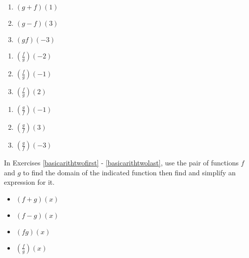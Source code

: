 \begin{multicols}{3}
\begin{enumerate}
\setcounter{enumi}{\value{HW}}

\item $(g + f)(1)$
\item $(g - f)(3)$
\item $(gf)(-3)$

\setcounter{HW}{\value{enumi}}
\end{enumerate}
\end{multicols}

\begin{multicols}{3}
\begin{enumerate}
\setcounter{enumi}{\value{HW}}

\item $\left(\frac{f}{g}\right)(-2)$
\item $\left(\frac{f}{g}\right)(-1)$
\item $\left(\frac{f}{g}\right)(2)$

\setcounter{HW}{\value{enumi}}
\end{enumerate}
\end{multicols}

\begin{multicols}{3}
\begin{enumerate}
\setcounter{enumi}{\value{HW}}

\item $\left(\frac{g}{f}\right)(-1)$
\item $\left(\frac{g}{f}\right)(3)$
\item $\left(\frac{g}{f}\right)(-3)$ \label{reformarithlast}

\setcounter{HW}{\value{enumi}}
\end{enumerate}
\end{multicols}

In Exercises \ref{basicarithtwofirst} - \ref{basicarithtwolast}, use the pair of functions $f$ and $g$ to find the domain of the indicated function then find and simplify an expression for it.

\begin{multicols}{4}
\begin{itemize}

\item  $(f+g)(x)$
\item  $(f-g)(x)$
\item  $(fg)(x)$
\item  $\left(\frac{f}{g}\right)(x)$

\end{itemize}
\end{multicols}

